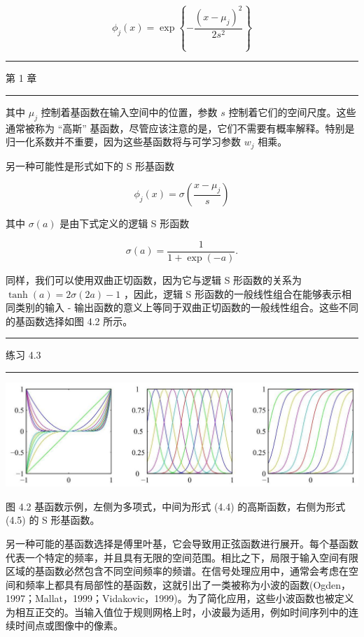 \documentclass[10pt]{article}
\newcommand{\HRule}{\begin{center}\rule{0.9\linewidth}{0.2mm}\end{center}}
\begin{document}
\[
{\phi }_{j}\left( x\right)  = \exp \left\{  {-\frac{{\left( x - {\mu }_{j}\right) }^{2}}{2{s}^{2}}}\right\}   \tag{4.4}
\]

\HRule

第 1 章

\HRule

其中 \({\mu }_{j}\) 控制着基函数在输入空间中的位置，参数 \(s\) 控制着它们的空间尺度。这些通常被称为 “高斯” 基函数，尽管应该注意的是，它们不需要有概率解释。特别是归一化系数并不重要，因为这些基函数将与可学习参数 \({w}_{j}\) 相乘。

另一种可能性是形式如下的 S 形基函数

\[
{\phi }_{j}\left( x\right)  = \sigma \left( \frac{x - {\mu }_{j}}{s}\right)  \tag{4.5}
\]

其中 \(\sigma \left( a\right)\) 是由下式定义的逻辑 S 形函数

\[
\sigma \left( a\right)  = \frac{1}{1 + \exp \left( {-a}\right) }. \tag{4.6}
\]

同样，我们可以使用双曲正切函数，因为它与逻辑 S 形函数的关系为 \(\tanh \left( a\right)  = {2\sigma }\left( {2a}\right)  - 1\) ，因此，逻辑 S 形函数的一般线性组合在能够表示相同类别的输入 - 输出函数的意义上等同于双曲正切函数的一般线性组合。这些不同的基函数选择如图 4.2 所示。

\HRule

练习 4.3

\HRule

\begin{center}
\includegraphics[max width=1.0\textwidth]{images/0194e279-9b28-703a-88f4-c3ac21e2010d_133_227_365_1298_385_0.jpg}
\end{center}
\hspace*{3em} 

图 4.2 基函数示例，左侧为多项式，中间为形式 (4.4) 的高斯函数，右侧为形式 (4.5) 的 S 形基函数。

另一种可能的基函数选择是傅里叶基，它会导致用正弦函数进行展开。每个基函数代表一个特定的频率，并且具有无限的空间范围。相比之下，局限于输入空间有限区域的基函数必然包含不同空间频率的频谱。在信号处理应用中，通常会考虑在空间和频率上都具有局部性的基函数，这就引出了一类被称为小波的函数(Ogden，1997；Mallat，1999；Vidakovic，1999)。为了简化应用，这些小波函数也被定义为相互正交的。当输入值位于规则网格上时，小波最为适用，例如时间序列中的连续时间点或图像中的像素。
\end{document}
